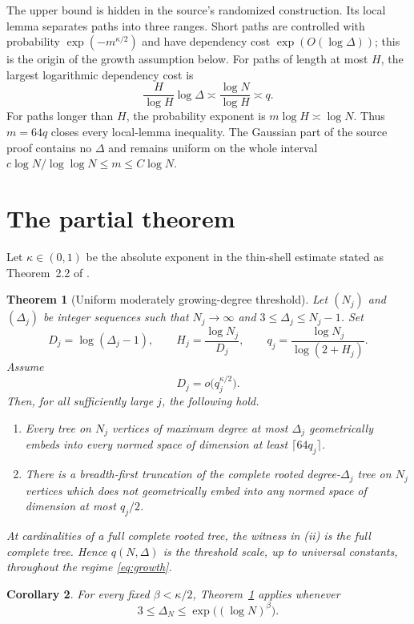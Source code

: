 \documentclass[11pt]{article}
\newtheorem{theorem}{Theorem}
\newtheorem{corollary}[theorem]{Corollary}
\begin{document}
The upper bound is hidden in the source's randomized construction. Its local
lemma separates paths into three ranges. Short paths are controlled with
probability $\exp(-m^{\kappa/2})$ and have dependency cost
$\exp(O(\log\Delta))$; this is the origin of the growth assumption below.
For paths of length at most $H$, the largest logarithmic dependency cost is
\[
 \frac{H}{\log H}\log\Delta\asymp \frac{\log N}{\log H}\asymp q.
\]
For paths longer than $H$, the probability exponent is $m\log H\asymp\log N$.
Thus $m=64q$ closes every local-lemma inequality. The Gaussian part of the
source proof contains no $\Delta$ and remains uniform on the whole interval
$c\log N/\log\log N\leq m\leq C\log N$.

\section*{The partial theorem}

Let $\kappa\in(0,1)$ be the absolute exponent in the thin-shell estimate
stated as Theorem~2.2 of \cite{ADTT}.

\begin{theorem}[Uniform moderately growing-degree threshold]\label{thm:main}
Let $(N_j)$ and $(\Delta_j)$ be integer sequences such that
$N_j\to\infty$ and $3\leq\Delta_j\leq N_j-1$. Set
\[
 D_j=\log(\Delta_j-1),\qquad
 H_j=\frac{\log N_j}{D_j},\qquad
 q_j=\frac{\log N_j}{\log(2+H_j)}.
\]
Assume
\begin{equation}\label{eq:growth}
 D_j=o\big(q_j^{\kappa/2}\big).
\end{equation}
Then, for all sufficiently large $j$, the following hold.
\begin{enumerate}[label=(\roman*)]
 \item Every tree on $N_j$ vertices of maximum degree at most $\Delta_j$
 geometrically embeds into every normed space of dimension at least
 $\lceil64q_j\rceil$.
 \item There is a breadth-first truncation of the complete rooted
 degree-$\Delta_j$ tree on $N_j$ vertices which does not geometrically embed
 into any normed space of dimension at most $q_j/2$.
\end{enumerate}
At cardinalities of a full complete rooted tree, the witness in (ii) is the
full complete tree. Hence $q(N,\Delta)$ is the threshold scale, up to universal
constants, throughout the regime \eqref{eq:growth}.
\end{theorem}

\begin{corollary}\label{cor:beta}
For every fixed $\beta<\kappa/2$, Theorem~\ref{thm:main} applies whenever
\[
 3\leq\Delta_N\leq \exp\big((\log N)^\beta\big).
\]
\end{corollary}
\end{document}
